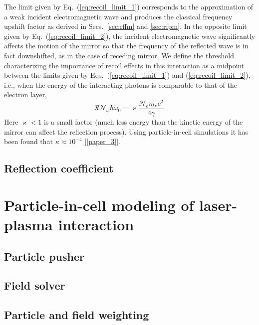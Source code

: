\documentclass[10pt, a4paper, twoside, openright]{report}
\begin{document}
The limit given by Eq.~(\ref{eq:recoil_limit_1}) corresponds to the approximation of a weak incident electromagnetic wave and produces the classical frequency upshift factor as derived in Secs.~\ref{sec:rffm} and \ref{sec:rfpm}. In the opposite limit given by Eq.~(\ref{eq:recoil_limit_2}), the incident electromagnetic wave significantly affects the motion of the mirror so that the frequency of the reflected wave is in fact downshifted, as in the case of receding mirror. We define the threshold characterizing the importance of recoil effects in this interaction as a midpoint between the limits given by Eqs.~(\ref{eq:recoil_limit_1}) and (\ref{eq:recoil_limit_2}), i.e., when the energy of the interacting photons is comparable to that of the electron layer,
\begin{equation}\label{eq:recoil_threshold}
	\mathcal{R} \mathcal{N}_{\omega} \hbar  \omega_0 = \varkappa \frac{\mathcal{N}_e m_e c^2}{4 \gamma}.
\end{equation}
Here $ \varkappa < 1 $ is a small factor (much less energy than the kinetic energy of the mirror can affect the reflection process). Using particle-in-cell simulations it has been found that $ \kappa \approx 10^{-4} $ [\ref{paper_3}]. 

\subsection{Reflection coefficient}




\section{Particle-in-cell modeling of laser-plasma interaction}
%

\subsection{Particle pusher}

\subsection{Field solver}

\subsection{Particle and field weighting}
\end{document}
